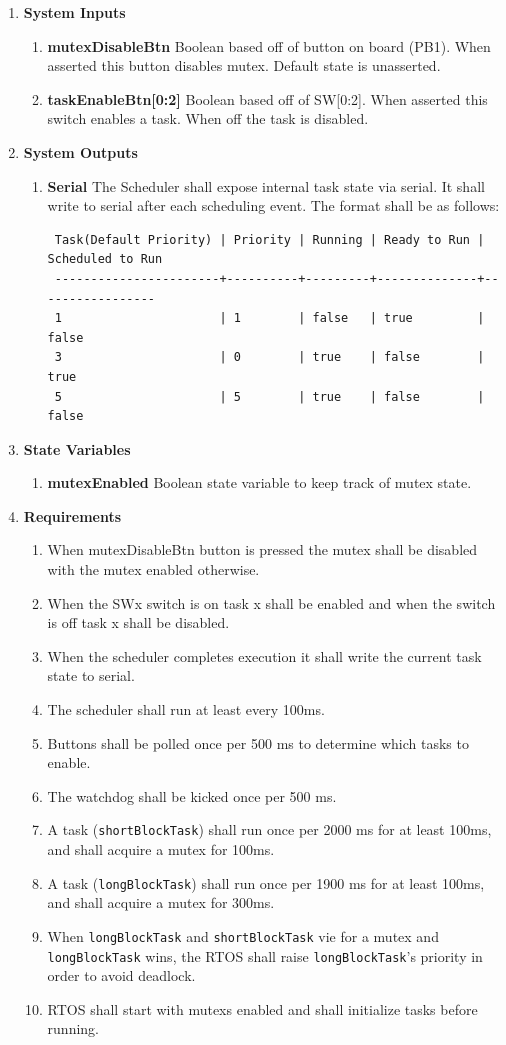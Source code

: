 \documentclass{article}
\newcommand{\bitem}[1]{\item \textbf{#1}}
\begin{document}
\begin{enumerate}
\bitem{System Inputs}
	\begin{enumerate}
	\bitem{mutexDisableBtn} Boolean based off of button on board (PB1). When asserted this button disables mutex. Default state is unasserted.
	\bitem{taskEnableBtn[0:2]} Boolean based off of SW[0:2]. When asserted this switch enables a task. When off the task is disabled.
	\end{enumerate}
\bitem{System Outputs}
	\begin{enumerate}
	\bitem{Serial} The Scheduler shall expose internal task state via serial. It shall write to serial after each scheduling event. The format shall be as follows:
\begin{verbatim}
 Task(Default Priority) | Priority | Running | Ready to Run | Scheduled to Run
 -----------------------+----------+---------+--------------+-----------------
 1                      | 1        | false   | true         | false
 3                      | 0        | true    | false        | true
 5                      | 5        | true    | false        | false
\end{verbatim}
	\end{enumerate}
\bitem{State Variables}
	\begin{enumerate}
	\bitem{mutexEnabled} Boolean state variable to keep track of mutex state.
	\end{enumerate}

\newpage

\bitem{Requirements}
	\begin{enumerate}
	\item When mutexDisableBtn button is pressed the mutex shall be disabled with the mutex enabled otherwise.
	\item When the SWx switch is on task x shall be enabled and when the switch is off task x shall be disabled.
	\item When the scheduler completes execution it shall write the current task state to serial.
	\item The scheduler shall run at least every 100ms.
	\item Buttons shall be polled once per 500 ms to determine which tasks to enable.
	\item The watchdog shall be kicked once per 500 ms.
	\item A task (\texttt{shortBlockTask}) shall run once per 2000 ms for at least 100ms, and shall acquire a mutex for 100ms.
	\item A task (\texttt{longBlockTask}) shall run once per 1900 ms for at least 100ms, and shall acquire a mutex for 300ms.
	\item When \texttt{longBlockTask} and \texttt{shortBlockTask} vie for a mutex and \texttt{longBlockTask} wins, the RTOS shall raise \texttt{longBlockTask}'s priority in order to avoid deadlock.
	\item RTOS shall start with mutexs enabled and shall initialize tasks before running.
	\end{enumerate}
\end{enumerate}
\end{document}
